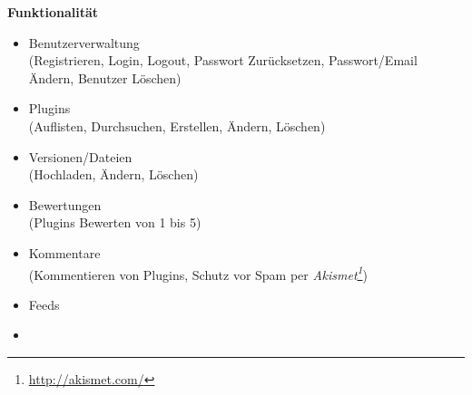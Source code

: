 \documentclass[pdftex,11pt,a4paper,notitlepage]{report}
\begin{document}
\begin{flushleft}
\textbf{Funktionalität}
\end{flushleft}

\begin{itemize}
\item Benutzerverwaltung \\
(Registrieren, Login, Logout, Passwort Zurücksetzen, Passwort/Email Ändern, Benutzer Löschen)
\item Plugins \\
(Auflisten, Durchsuchen, Erstellen, Ändern, Löschen)
\item Versionen/Dateien \\
(Hochladen, Ändern, Löschen)
\item Bewertungen \\
(Plugins Bewerten von 1 bis 5)
\item Kommentare \\
(Kommentieren von Plugins, Schutz vor Spam per \textit{Akismet\footnote{\url{http://akismet.com/}}})
\item Feeds
\item 
\end{itemize}
\end{document}
